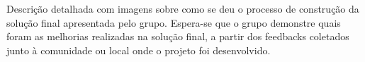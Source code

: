 Descrição detalhada com imagens sobre como se deu o processo de construção da
solução final apresentada pelo grupo. Espera-se que o grupo demonstre quais foram as
melhorias realizadas na solução final, a partir dos feedbacks coletados junto à comunidade
ou local onde o projeto foi desenvolvido.
